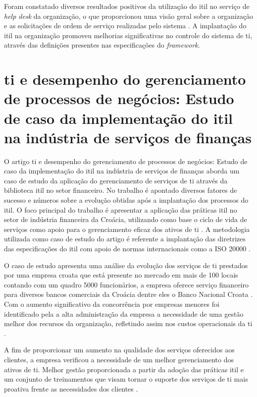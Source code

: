 Foram constatado diversos resultados positivos da utilização do \acrshort{itil} no serviço de \textit{help desk} da organização, o que proporcionou uma visão geral sobre a organização e as solicitações de ordem de serviço realizadas pelo sistema \cite{jantti2009defining}. A implantação do \acrshort{itil} na organização promoveu melhorias significativas no controle do sistema de \acrshort{ti}, através das definições presentes nas especificações do \textit{framework}.

\section{\acrshort{ti} e desempenho do gerenciamento de processos de negócios: Estudo de caso da implementação do \acrshort{itil} na indústria de serviços de finanças}

\noindent O artigo \acrshort{ti} e desempenho do gerenciamento de processos de negócios: Estudo de caso da implementação do \acrshort{itil} na indústria de serviços de finanças aborda um caso de estudo da aplicação do gerenciamento de serviços de \acrshort{ti} através da biblioteca \acrshort{itil} no setor financeiro. No trabalho é apontado diversos fatores de sucesso e números sobre a evolução obtidas após a implantação dos processos do \acrshort{itil}. O foco principal do trabalho é apresentar a aplicação das práticas \acrshort{itil} no setor de indústria financeira da Croácia, utilizando como base o ciclo de vida de serviços como apoio para o gerenciamento eficaz dos ativos de \acrshort{ti} \cite{spremic2008and}. A metodologia utilizada como caso de estudo do artigo é referente a implantação das diretrizes das especificações do \acrshort{itil} com apoio de normas internacionais como a ISO 20000 \cite{spremic2008and}.

O caso de estudo apresenta uma análise da evolução dos serviços de \acrshort{ti} prestados por uma empresa croata que está presente no mercado em mais de 100 locais contando com um quadro 5000 funcionários, a empresa oferece serviço financeiro para diversos bancos comerciais da Croácia dentre eles o Banco Nacional Croata \cite{spremic2008and}. Com o aumento significativo da concorrência por empresas menores foi identificado pela a alta administração da empresa a necessidade de uma gestão melhor dos recursos da organização, refletindo assim nos custos operacionais da \acrshort{ti} \cite{spremic2008and}.

A fim de proporcionar um aumento na qualidade dos serviços oferecidos aos clientes, a empresa verificou a necessidade de um melhor gerenciamento dos ativos de \acrshort{ti}. Melhor gestão proporcionada a partir da adoção das práticas \acrshort{itil} e um conjunto de treinamentos que visam tornar o suporte dos serviços de \acrshort{ti} mais proativa frente as necessidades dos clientes \cite{spremic2008and}.

